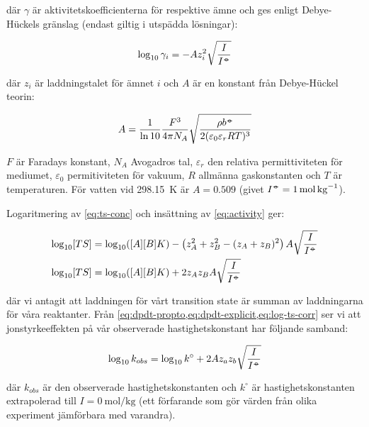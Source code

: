 där $\gamma$ är aktivitetskoefficienterna för respektive ämne och ges
enligt Debye-Hückels gränslag (endast giltig i utspädda lösningar):

\begin{equation}
  \label{eq:activity}
  \log_{10}\gamma_i = -Az_i^2\sqrt{\frac{I}{I^{-\kern-5pt{\circ}\kern-5pt-}}}
\end{equation}

där $z_i$ är laddningstalet för ämnet $i$ och $A$ är en konstant från Debye-Hückel teorin:

\begin{equation}
  \label{eq:debye-huckel-a}
  A = \frac{1}{\ln 10} \frac{F^3}{4\pi N_A}\sqrt{\frac{\rho b^{-\kern-5pt{\circ}\kern-5pt-}}{2(\varepsilon_0\varepsilon_rRT)^3}}
\end{equation}

$F$ är Faradays konstant, $N_A$ Avogadros tal, $\varepsilon_r$ den
relativa permittiviteten för mediumet, $\varepsilon_0$ permitiviteten för
vakuum, $R$ allmänna gaskonstanten och $T$ är temperaturen. För vatten vid
\SI{298.15}{\kelvin} är $A = 0.509$ (givet $I^\plimsoll =
\SI{1}{\mole\per\kg}$).

Logaritmering av \cref{eq:ts-conc} och insättning av \cref{eq:activity}
ger:

\begin{align}
  \log_{10}[TS] &= \log_{10}([A][B]K) - \left(z_A^2 + z_B^2 - (z_A+z_B)^2\right) A
                  \sqrt{\frac{I}{I^{-\kern-5pt{\circ}\kern-5pt-}}} \\
  \label{eq:log-ts-corr}
  \log_{10}[TS] &= \log_{10}([A][B]K) + 2z_Az_BA\sqrt{\frac{I}{I^{-\kern-5pt{\circ}\kern-5pt-}}}
\end{align}

där vi antagit att laddningen för vårt transition state är summan av
laddningarna för våra reaktanter.
Från \cref{eq:dpdt-propto,eq:dpdt-explicit,eq:log-ts-corr} ser vi att jonstyrkeeffekten
på vår observerade hastighetskonstant har följande samband:

\begin{equation}
  \label{eq:kinetic-salt}
  \log_{10} k_{obs} = \log_{10} k^{\circ} + 2Az_az_b\sqrt{\frac{I}{I^{-\kern-5pt{\circ}\kern-5pt-}}}
\end{equation}

där $k_{obs}$ är den observerade hastighetskonstanten och $k^{\circ}$ är
hastighetskonstanten extrapolerad till $I = \SI{0}{\mole\per\kg}$ (ett
förfarande som gör värden från olika experiment jämförbara med
varandra).

